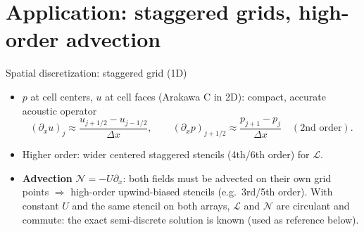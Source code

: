 \documentclass[aspectratio=169,10pt]{beamer}
\newcommand{\LL}{\mathcal{L}}   %
\newcommand{\NN}{\mathcal{N}}   %
\begin{document}
\section{Application: staggered grids, high-order advection}

\begin{frame}{Spatial discretization: staggered grid (1D)}
  \begin{center}
  \end{center}
  \begin{itemize}
    \item $p$ at cell centers, $u$ at cell faces (Arakawa C in 2D): compact, accurate acoustic operator
    \[
      (\partial_x u)_j\approx\frac{u_{j+1/2}-u_{j-1/2}}{\Delta x},\qquad
      (\partial_x p)_{j+1/2}\approx\frac{p_{j+1}-p_j}{\Delta x}\quad(\text{2nd order}).
    \]
    \item Higher order: wider centered staggered stencils (4th/6th order) for $\LL$.
    \item \textbf{Advection} $\NN=-U\partial_x$: both fields must be advected on their own grid points
    $\Rightarrow$ high-order upwind-biased stencils (e.g.\ 3rd/5th order). With constant $U$ and the same stencil on both
    arrays, $\LL$ and $\NN$ are circulant and commute: the exact semi-discrete solution is known (used as reference below).
  \end{itemize}
\end{frame}
\end{document}
